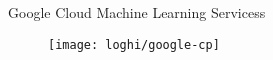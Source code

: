 %
\begin{frame}[t]{Google Cloud Machine Learning Servicess}
	\begin{figure}[!h]
	\centering
	\vfill
	\texttt{[image: loghi/google-cp]}
	\vfill
	\end{figure}
\end{frame}
%
